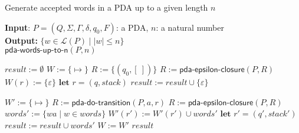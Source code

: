 \documentclass[11pt]{article}
\newcommand*{\Language}[1]{\ensuremath{\mathcal{L}(#1)}}
\newcommand{\emptylist}{\ensuremath{[\:]}}
\newcommand{\emptymap}{\ensuremath{\{ \mapsto \}}}
\begin{document}
\begin{algorithm}
\small
\caption{Generate accepted words in a PDA up to a given length $n$}
\vspace*{1ex}
{\textbf{Input}:} $P = (Q, \Sigma, \Gamma, \delta, q_0, F)$: a PDA, $n$: a natural number \\
\textbf{Output:}
$ \{ w \in \Language{P} \mid |w| \leq n \} $ \\

$\textsf{pda-words-up-to-n}(P, n)$
\begin{algorithmic}[1]

\State $result := \emptyset$
\State $W := \emptymap$
\State $R := \{ (q_0, \emptylist) \}$
\State $R := \textsf{pda-epsilon-closure}(P, R)$
  \State $W(r) := \{ \varepsilon \}$
  \State $\textbf{let } r = (q, stack)$
    \State $result := result \cup \{ \varepsilon \}$
  \EndIf
\EndFor

  \State $W' := \emptymap$
      \State $R := \textsf{pda-do-transition}(P, a, r)$
      \State $R := \textsf{pda-epsilon-closure}(P, R)$
      \State $words' := \{ wa \mid w \in words \}$
        \State $W'(r') := W'(r') \cup words'$
        \State $\textbf{let } r' = (q', stack')$
          \State $result := result \cup words'$
        \EndIf
      \EndFor
    \EndFor
  \EndFor
  \State $W := W'$
\EndFor
\State \Return $result$
\end{algorithmic}
\end{algorithm}
\end{document}
